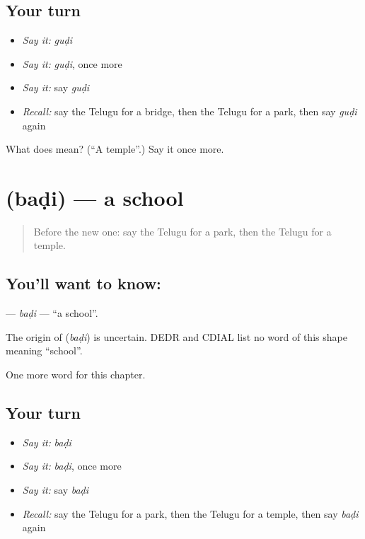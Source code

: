 \subsection*{Your turn}
\begin{itemize}
\raggedright
  \item \emph{Say it:} \emph{guḍi}
  \item \emph{Say it:} \emph{guḍi}, once more
  \item \emph{Say it:} say \emph{guḍi}
  \item \emph{Recall:} say the Telugu for a bridge, then the Telugu for a park, then say \emph{guḍi} again
\end{itemize}

\begin{tcolorbox}[breakable,colback=teal!4,colframe=teal!35!black,title={Before you move on}]
What does  mean? (\textquotedblleft{}A temple\textquotedblright{}.) Say it once more.
\end{tcolorbox}
\section[\texorpdfstring{\te{బడి} (baḍi)}{బడి (baḍi)}]{ (baḍi) — a school}

\label{lesson:TE-C103-badi}



\begin{quote}
Before the new one: say the Telugu for a park, then the Telugu for a temple.
\end{quote}

\subsection*{You'll want to know: }
\textbf{} — \emph{baḍi} — \textquotedblleft{}a school\textquotedblright{}.

\begin{cousinweb}
The origin of \textbf{} (\emph{baḍi}) is uncertain. DEDR and CDIAL list no word of this shape meaning \textquotedblleft{}school\textquotedblright{}.
\end{cousinweb}

\begin{grammarlens}[title={What you've built}]
One more word for this chapter.
\end{grammarlens}

\subsection*{Your turn}
\begin{itemize}
\raggedright
  \item \emph{Say it:} \emph{baḍi}
  \item \emph{Say it:} \emph{baḍi}, once more
  \item \emph{Say it:} say \emph{baḍi}
  \item \emph{Recall:} say the Telugu for a park, then the Telugu for a temple, then say \emph{baḍi} again
\end{itemize}

